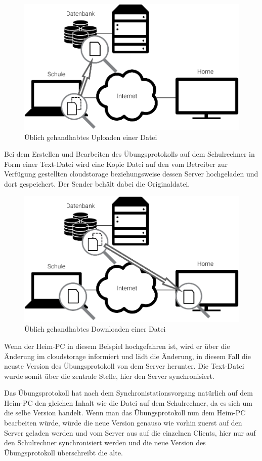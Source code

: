 \begin{figure}[ht]
	\centering
  \includegraphics[]{images/dropbox_upload}
  \caption{Üblich gehandhabtes Uploaden einer Datei}
\end{figure}

Bei dem Erstellen und Bearbeiten des Übungsprotokolls auf dem Schulrechner in Form
einer Text-Datei wird eine Kopie Datei auf den vom Betreiber zur Verfügung gestellten
\gls{cloudstorage} beziehungsweise dessen Server hochgeladen und dort gespeichert.
Der Sender behält dabei die Originaldatei.

\begin{figure}[ht]
	\centering
  \includegraphics[]{images/dropbox_download}
  \caption{Üblich gehandhabtes Downloaden einer Datei}
\end{figure}

Wenn der Heim-PC in diesem Beispiel hochgefahren ist, wird er
über die Änderung im \gls{cloudstorage} informiert und lädt die Änderung, in
diesem Fall die neuste Version des Übungsprotokoll von dem Server herunter.
Die Text-Datei wurde somit über die zentrale Stelle, hier den Server synchronisiert.

Das Übungsprotokoll hat nach dem Synchronistationsvorgang natürlich auf dem Heim-PC
den gleichen Inhalt wie die Datei auf dem Schulrechner, da es sich um die selbe Version
handelt. Wenn man das Übungsprotokoll nun dem Heim-PC bearbeiten würde, würde
die neue Version genauso wie vorhin zuerst auf den Server geladen werden und vom Server
aus auf die einzelnen Clients, hier nur auf den Schulrechner synchronisiert
werden und die neue Version des Übungsprotokoll überschreibt die alte.
